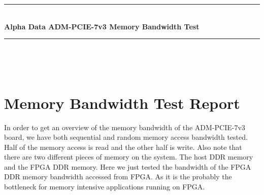 \documentclass[12pt]{article} %
\begin{document}

\begin{titlepage}

\newcommand{\HRule}{\rule{\linewidth}{0.5mm}} %

\center %

\HRule \\[0.4cm]
{ \huge \bfseries Alpha Data ADM-PCIE-7v3 Memory Bandwidth Test}\\[0.4cm] %
\HRule \\[1.5cm]

\begin{minipage}{0.4\textwidth}
     \\ 
    \vspace{2em}
    \centering {\large \today}
\end{minipage}

\end{titlepage}




\section{Memory Bandwidth Test Report} %
In order to get an overview of the memory bandwidth of the ADM-PCIE-7v3 board, 
we have both sequential and random memory access bandwidth tested. Half of the memory access 
is read and the other half is write. Also note that 
there are two different pieces of memory on the system. The host DDR memory and the 
FPGA DDR memory. Here we just tested the bandwidth of the FPGA DDR memory bandwidth 
accessed from FPGA. As it is the probably the bottleneck for memory intensive 
applications running on FPGA.
\end{document}
